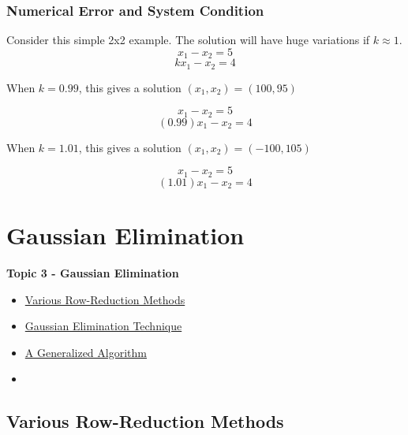 \documentclass[fleqn]{beamer} %
\newcommand{\sectionIVtitle}{Gaussian Elimination}
\newcommand{\sectionIIIsubsectionIVtitle}{Numerical Error and System Condition}
\newcommand{\sectionIVsubsectionItitle}{Various Row-Reduction Methods}
\newcommand{\sectionIVsubsectionIItitle}{Gaussian Elimination Technique}
\newcommand{\sectionIVsubsectionIIItitle}{A Generalized Algorithm}
\newcommand{\sectionIVsubsectionIVtitle}{}
\begin{document}
			\begin{frame}
				\frametitle{\sectionIIIsubsectionIVtitle}
				\bigskip

				\begin{fleqn}
				  
				  	Consider this simple 2x2 example. The solution will have huge variations if $ k\approx 1 $. \\
				
					\[x_1 - x_2=5\] 
					\[kx_1 - x_2=4\]
				
				  	When $ k = 0.99 $, this gives a solution $(x_1,x_2)=(100, 95)$	
				
					\[x_1 - x_2=5\] 
					\[(0.99)x_1 - x_2=4\]
				
				 	When $ k = 1.01 $, this gives a solution $(x_1,x_2)=(-100, 105)$	
				
					\[x_1 - x_2=5\] 
					\[(1.01)x_1 - x_2=4\]
					
				\end{fleqn}

				\btVFill
			\end{frame}	
	


	\section{\sectionIVtitle}\label{sectionIV}

		\begin{frame}
			\large \textbf{Topic 3 - \sectionIVtitle} \vspace{3mm}\\

			\begin{itemize}
				\item \hyperlink{sectionIVsubsectionI}{\sectionIVsubsectionItitle} \vspc %
				\item \hyperlink{sectionIVsubsectionII}{\sectionIVsubsectionIItitle} \vspc %
				\item \hyperlink{sectionIVsubsectionIII}{\sectionIVsubsectionIIItitle} \vspc %
				\item \hyperlink{sectionIVsubsectionIV}{\sectionIVsubsectionIVtitle} \vspc %
			\end{itemize}

		\end{frame}

		\subsection{\sectionIVsubsectionItitle}\label{sectionIVsubsectionI}
\end{document}
